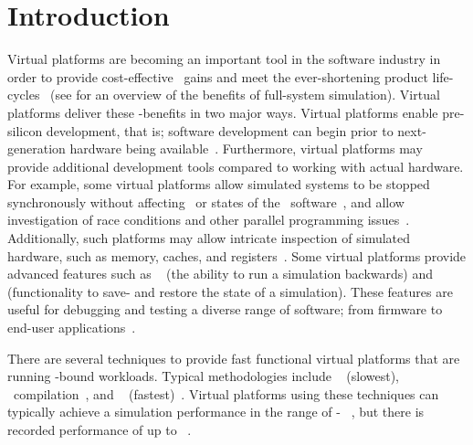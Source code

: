 
\chapter{Introduction}
\label{cha:introduction}
Virtual platforms are becoming an important tool in the software industry in order to provide cost-effective \dvttermttm\ gains and meet the ever-shortening product life-cycles~ (see  for an overview of the benefits of full-system simulation).
Virtual platforms deliver these \dvttermttm -benefits in two major ways.
Virtual platforms enable pre-silicon development, that is; software development can begin prior to next-generation hardware being available~.
Furthermore, virtual platforms may provide additional development tools compared to working with actual hardware.
For example, some virtual platforms allow simulated systems to be stopped synchronously without affecting \dvttermtiming\ or states of the \dvttermtarget\ software~, and allow investigation of race conditions and other parallel programming issues~.
Additionally, such platforms may allow intricate inspection of simulated hardware, such as memory, caches, and registers~.
Some virtual platforms provide advanced features such as \dvttermreverseexecution ~ (the ability to run a simulation backwards) and \dvttermcheckpointing ~ (functionality to save- and restore the state of a simulation).
These features are useful for debugging and testing a diverse range of software; from firmware to end-user applications~.

There are several techniques to provide fast functional virtual platforms that are running \dvttermcpu -bound workloads.
Typical methodologies include \dvtterminterpretation ~ (slowest), \dvttermjit\ compilation~, and \dvttermdirectvirtualization ~ (fastest)~.
Virtual platforms using these techniques can typically achieve a simulation performance in the range of - \dvttermmipsecond ~, but there is recorded performance of up to  \dvttermmipsecond ~.

